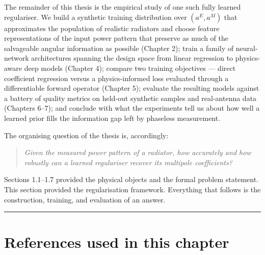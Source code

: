 \documentclass[
  english,
  11pt,
]{report}
\begin{document}
The remainder of this thesis is the empirical study of one such fully
learned regulariser. We build a synthetic training distribution over
\((a^E, a^M)\) that approximates the population of realistic radiators
and choose feature representations of the input power pattern that
preserve as much of the salvageable angular information as possible
(Chapter 2); train a family of neural-network architectures spanning the
design space from linear regression to physics-aware deep models
(Chapter 4); compare two training objectives --- direct coefficient
regression versus a physics-informed loss evaluated through a
differentiable forward operator (Chapter 5); evaluate the resulting
models against a battery of quality metrics on held-out synthetic
samples and real-antenna data (Chapters 6--7); and conclude with what
the experiments tell us about how well a learned prior fills the
information gap left by phaseless measurement.

The organising question of the thesis is, accordingly:

\begin{quote}
\emph{Given the measured power pattern of a radiator, how accurately and
how robustly can a learned regulariser recover its multipole
coefficients?}
\end{quote}

Sections 1.1--1.7 provided the physical objects and the formal problem
statement. This section provided the regularisation framework.
Everything that follows is the construction, training, and evaluation of
an answer.

\begin{center}\rule{0.5\linewidth}{0.5pt}\end{center}

\section{References used in this
chapter}\label{references-used-in-this-chapter}
\end{document}
